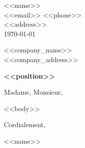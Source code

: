 \documentclass[11pt]{article}
\begin{document}
\begin{flushright}
<<name>>\\
{\small <<email>> \quad <<phone>>}\\
{\small <<address>>}\\[1em]
{\small \today}
\end{flushright}

\vspace{1.5em}

<<company_name>>\\
<<company_address>>

\vspace{1.5em}

\textbf{<<position>>}

\vspace{1em}

Madame, Monsieur,

\vspace{0.5em}

<<body>>

\vspace{1.5em}

Cordialement,

\vspace{2em}

<<name>>
\end{document}
